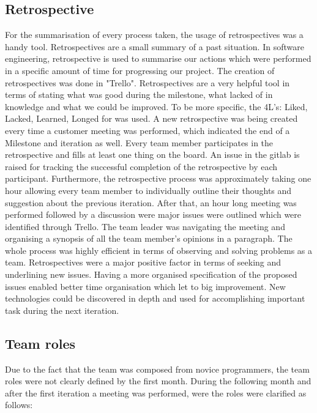 \documentclass{l3proj}
\begin{document}
\subsection{Retrospective}
\label{retrospective}

For the summarisation of every process taken, the usage of retrospectives was a handy tool. Retrospectives are a small summary of a past situation. In software engineering, retrospective is used to summarise our actions which were performed in a specific amount of time for progressing our project. The creation of retrospectives was done in "Trello". Retrospectives are a very helpful tool in terms of stating what was good during the milestone, what lacked of in knowledge and what we could be improved. To be more specific, the 4L's: Liked, Lacked, Learned, Longed for was used. A new retrospective was being created every time a customer meeting was performed, which indicated the end of a Milestone and iteration as well.  Every team member participates in the retrospective and fills at least one thing on the board. An issue in the gitlab is raised  for tracking the successful completion of the retrospective by each participant. Furthermore, the retrospective process was approximately taking one hour allowing every team member to individually outline their thoughts and suggestion about the previous iteration. After that, an hour long meeting was performed followed by a discussion were major issues were outlined which were identified through Trello. The team leader was navigating the meeting and organising a synopsis of all the team member's opinions in a paragraph. The whole process was highly efficient in terms of observing and solving problems as a team. Retrospectives were a major positive factor in terms of seeking and underlining new issues. Having a more organised specification of the proposed issues enabled better time organisation which let to big improvement. New technologies could be discovered in depth and used for accomplishing important task during the next iteration.

\subsection{Team roles}
\label{roles}

Due to the fact that the team was composed from novice programmers, the team roles were not clearly defined by the first month. During the following month and after the first iteration a meeting was performed, were the roles were clarified as follows:
\end{document}
